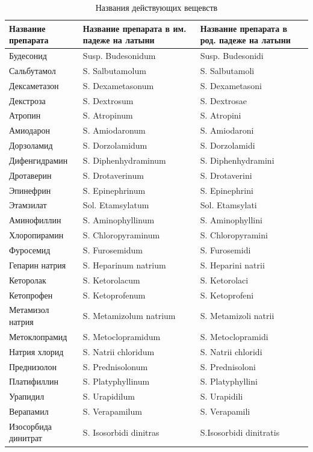 \begin{table}    
    \caption{Названия действующих вещевств}
    \begin{tabularx}{\textwidth}{|X|X|X|}\hline
    Название препарата & Название препарата в им. падеже на латыни & Название препарата в род. падеже на латыни  \\ \hline
    Будесонид & Susp. Budesonidum & Susp. Budesonidi \\ \hline
    Сальбутамол & S. Salbutamolum & S. Salbutamoli \\ \hline
    Дексаметазон & S. Dexametasonum  & S. Dexametasoni \\ \hline
    Декстроза & S. Dextrosum & S. Dextrosae \\ \hline
    Атропин & S. Atropinum & S. Atropini \\ \hline
    Амиодарон & S. Amiodaronum &	S. Amiodaroni \\ \hline
    Дорзоламид & S. Dorzolamidum	& S. Dorzolamidi \\ \hline
    Дифенгидрамин& S. Diphenhydraminum	& S. Diphenhydramini \\ \hline
    Дротаверин & S. Drotaverinum	& S. Drotaverini \\ \hline
    Эпинефрин & S. Epinephrinum	& S. Epinephrini \\ \hline
    Этамзилат & Sol. Etamsylatum	& Sol. Etamsylati \\ \hline
    Аминофиллин & S. Aminophyllinum 	& S. Aminophyllini \\ \hline
    Хлоропирамин & S. Chloropyraminum 	& S. Chloropyramini \\ \hline
    Фуросемид & S. Furosemidum 	& S. Furosemidi \\ \hline
    Гепарин натрия & S. Heparinum natrium 	& S. Heparini natrii \\ \hline 
    Кеторолак & S. Ketorolacum 	& S. Ketorolaci \\ \hline
    Кетопрофен & S. Ketoprofenum 	& S. Ketoprofeni \\ \hline
    Метамизол натрия & S. Metamizolum natrium		& S. Metamizoli natrii \\ \hline
    Метоклопрамид & S. Metoclopramidum	& S. Metoclopramidi \\ \hline
    Натрия хлорид & S. Natrii chloridum	& S. Natrii chloridi \\ \hline
    Преднизолон & S. Prednisolonum 	& S. Prednisoloni \\ \hline
    Платифиллин & S. Platyphyllinum 	& S. Platyphyllini \\ \hline
    Урапидил & S. Urapidilum 	& S. Urapidili \\ \hline
    Верапамил & S. Verapamilum	& S. Verapamili \\ \hline
    Изосорбида динитрат & S. Isosorbidi dinitras 	& S.Isosorbidi dinitratis \\ \hline
    \end{tabularx}
    \label{tab:tab1}
\end{table}

